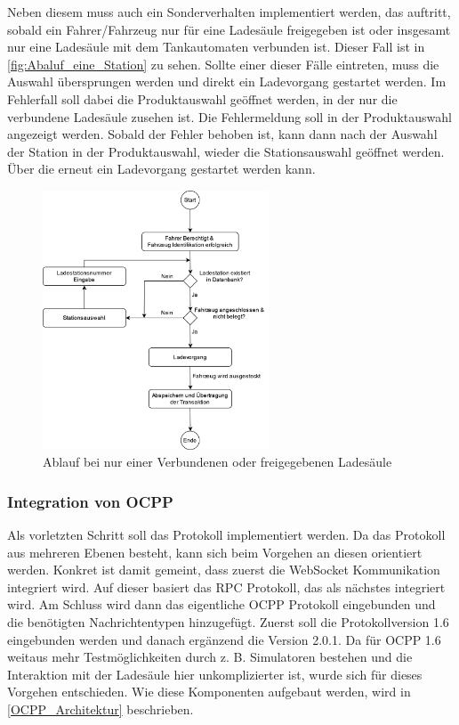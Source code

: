 \noindent Neben diesem muss auch ein Sonderverhalten implementiert werden, das auftritt, sobald ein Fahrer/Fahrzeug nur für eine Ladesäule freigegeben ist oder insgesamt nur eine Ladesäule mit dem Tankautomaten verbunden ist. Dieser Fall ist in \autoref{fig:Abaluf_eine_Station} zu sehen. Sollte einer dieser Fälle eintreten, muss die Auswahl übersprungen werden und direkt ein Ladevorgang gestartet werden. Im Fehlerfall soll dabei die Produktauswahl geöffnet werden, in der nur die verbundene Ladesäule zusehen ist. Die Fehlermeldung soll in der Produktauswahl angezeigt werden. Sobald der Fehler behoben ist, kann dann nach der Auswahl der Station in der Produktauswahl, wieder die Stationsauswahl geöffnet werden. Über die erneut ein Ladevorgang gestartet werden kann. 
\begin{figure}[H]
	\centering
	\includegraphics[width=0.6\textwidth]{images/Architektur/Ablauf_eine_Station.jpg}
	\caption{Ablauf bei nur einer Verbundenen oder freigegebenen Ladesäule \cite{Eigene_Darstellung}}
	\label{fig:Abaluf_eine_Station}
\end{figure}
\subsubsection{Integration von OCPP}
Als vorletzten Schritt soll das Protokoll implementiert werden. Da das Protokoll aus mehreren Ebenen besteht, kann sich beim Vorgehen an diesen orientiert werden. Konkret ist damit gemeint, dass zuerst die WebSocket Kommunikation integriert wird. Auf dieser basiert das RPC Protokoll, das als nächstes integriert wird. Am Schluss wird dann das eigentliche OCPP Protokoll eingebunden und die benötigten Nachrichtentypen hinzugefügt. Zuerst soll die Protokollversion 1.6 eingebunden werden und danach ergänzend die Version 2.0.1. Da für OCPP 1.6 weitaus mehr Testmöglichkeiten durch z. B. Simulatoren bestehen und die Interaktion mit der Ladesäule hier unkomplizierter ist, wurde sich für dieses Vorgehen entschieden. Wie diese Komponenten aufgebaut werden, wird in \autoref{OCPP_Architektur} beschrieben.

